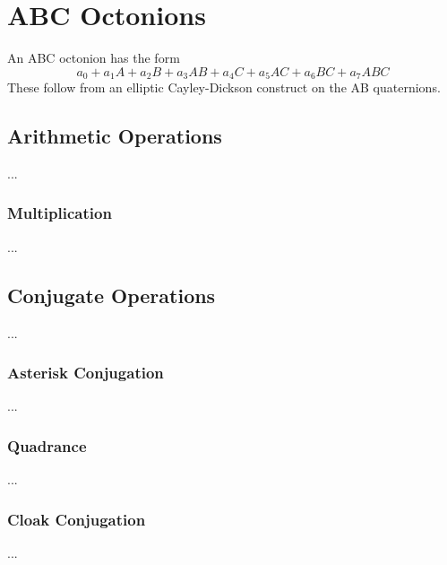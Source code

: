 \chapter{ABC Octonions}
An ABC octonion has the form
\begin{equation}
    a_{0} + a_{1} A + a_{2} B + a_{3} AB + a_{4} C + a_{5} AC + a_{6} BC + a_{7} ABC
\end{equation}
These follow from an elliptic Cayley-Dickson construct on the AB quaternions.
\section{Arithmetic Operations}
...
\subsection{Multiplication}
...
\section{Conjugate Operations}
...
\subsection{Asterisk Conjugation}
...
\subsection{Quadrance}
...
\subsection{Cloak Conjugation}
...

